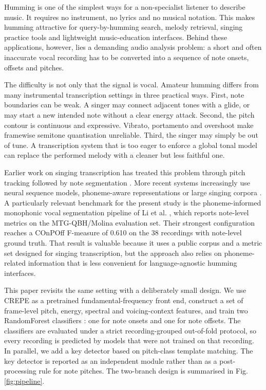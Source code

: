 \documentclass[pdflatex,sn-mathphys-num]{sn-jnl}
\begin{document}
Humming is one of the simplest ways for a non-specialist listener to describe music. It requires no instrument, no lyrics and no musical notation. This makes humming attractive for query-by-humming search, melody retrieval, singing practice tools and lightweight music-education interfaces. Behind these applications, however, lies a demanding audio analysis problem: a short and often inaccurate vocal recording has to be converted into a sequence of note onsets, offsets and pitches.

The difficulty is not only that the signal is vocal. Amateur humming differs from many instrumental transcription settings in three practical ways. First, note boundaries can be weak. A singer may connect adjacent tones with a glide, or may start a new intended note without a clear energy attack. Second, the pitch contour is continuous and expressive. Vibrato, portamento and overshoot make framewise semitone quantisation unreliable. Third, the singer may simply be out of tune. A transcription system that is too eager to enforce a global tonal model can replace the performed melody with a cleaner but less faithful one.

Earlier work on singing transcription has treated this problem through pitch tracking followed by note segmentation \cite{molina2015sipth,yang2017probabilistic,fu2019hierarchical}. More recent systems increasingly use neural sequence models, phoneme-aware representations or large singing corpora \cite{yong2023phoneme,park2023transformers,li2024rosvot,guo2025stars,kim2025timealigned}. A particularly relevant benchmark for the present study is the phoneme-informed monophonic vocal segmentation pipeline of Li et al. \cite{li2021phoneme}, which reports note-level metrics on the MTG-QBH/Molina evaluation set. Their strongest configuration reaches a COnPOff F-measure of 0.610 on the 38 recordings with note-level ground truth. That result is valuable because it uses a public corpus and a metric set designed for singing transcription, but the approach also relies on phoneme-related information that is less convenient for language-agnostic humming interfaces.

This paper revisits the same setting with a deliberately small design. We use CREPE \cite{kim2018crepe} as a pretrained fundamental-frequency front end, construct a set of frame-level pitch, energy, spectral and voicing-context features, and train two RandomForest classifiers \cite{breiman2001random}: one for note onsets and one for note offsets. The classifiers are evaluated under a strict recording-grouped out-of-fold protocol, so every recording is predicted by models that were not trained on that recording. In parallel, we add a key detector based on pitch-class template matching. The key detector is reported as an independent module rather than as a post-processing rule for note pitches. The two-branch design is summarised in Fig. \ref{fig:pipeline}.
\end{document}
